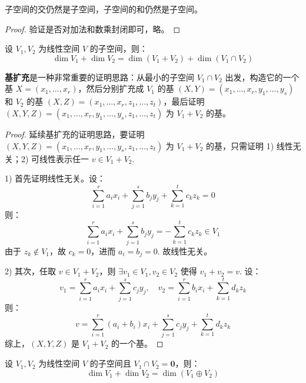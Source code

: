 
\begin{theorem}
子空间的交仍然是子空间，子空间的和仍然是子空间。
\end{theorem}
\begin{proof}
验证是否对加法和数乘封闭即可，略。
\end{proof}

\begin{theorem}[子空间和的维数公式]
设 $V_1,V_2$ 为线性空间 $V$ 的子空间，则：
\[
    \dim V_1+\dim V_2=\dim (V_1+V_2)+\dim (V_1\cap V_2)
\]    
\end{theorem}

\begin{remark}[基扩充]
\textbf{基扩充}是一种非常重要的证明思路：从最小的子空间 $V_1\cap V_2$ 出发，构造它的一个基 $X=(x_1,\ldots,x_r)$，然后分别扩充成 $V_1$ 的基 $(X,Y)=(x_1,\ldots,x_r,y_1,\ldots,y_s)$ 和 $V_2$ 的基 $(X,Z)=(x_1,\ldots,x_r,z_1,\ldots,z_t)$，最后证明 $(X,Y,Z)=(x_1,\ldots,x_r,y_1,\ldots,y_s,z_1,\ldots,z_t)$ 为 $V_1+V_2$ 的基。    
\end{remark}

\begin{proof}
延续基扩充的证明思路，要证明 $(X,Y,Z)=(x_1,\ldots,x_r,y_1,\ldots,y_s,z_1,\ldots,z_t)$ 为 $V_1+V_2$ 的基，只需证明 1) 线性无关；2) 可线性表示任一 $v\in V_1+V_2$.

1) 首先证明线性无关。设：
\[
    \sum_{i=1}^r a_ix_i+\sum_{j=1}^s b_jy_j+\sum_{k=1}^t c_kz_k=0
\]
则：
\[
    \sum_{i=1}^r a_ix_i+\sum_{j=1}^s b_jy_j=-\sum_{k=1}^t c_kz_k\in V_1
\]
由于 $z_k\notin V_1$，故 $c_k=0$，进而 $a_i=b_j=0$. 故线性无关。

2) 其次，任取 $v\in V_1+V_2$，则 $\exists v_1\in V_1,v_2\in V_2$ 使得 $v_1+v_2=v$. 设：
\[
    v_1=\sum_{i=1}^r a_ix_i+\sum_{j=1}^s c_jy_j,\quad v_2=\sum_{i=1}^r b_ix_i+\sum_{k=1}^t d_kz_k
\]
则：
\[
    v=\sum_{i=1}^r(a_i+b_i)x_i+\sum_{j=1}^s c_jy_j+\sum_{k=1}^t d_kz_k
\]
综上，$(X,Y,Z)$ 是 $V_1+V_2$ 的一个基。    
\end{proof}

\begin{corollary}
设 $V_1,V_2$ 为线性空间 $V$ 的子空间且 $V_1\cap V_2=\mathbf 0$，则：
\[
    \dim V_1+\dim V_2=\dim (V_1\oplus V_2)
\]
\end{corollary}


